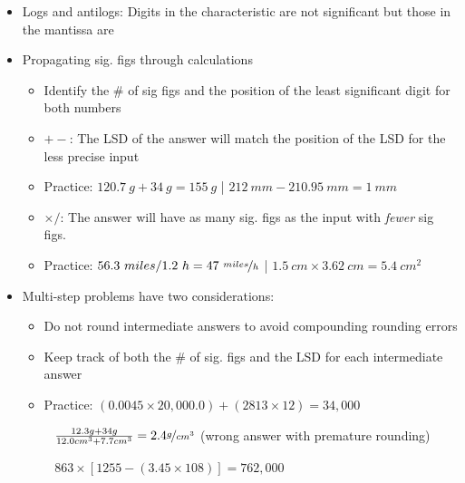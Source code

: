\documentclass[12pt, openany, letterpaper]{memoir}
\begin{document}
\begin{itemize}
	\item Logs and antilogs: Digits in the characteristic are not significant but those in the mantissa are
	\item Propagating sig. figs through calculations
	      \begin{itemize}
		      \item Identify the \# of sig figs and the position of the least significant digit for both numbers
		      \item $+-$: The LSD of the answer will match the position of the LSD for the less precise input
		      \item Practice: $120.7~g + 34~g = 155~g$ \hspace{1em}|\hspace{1em} $212~mm - 210.95~mm = 1~mm$
		      \item $\times/$: The answer will have as many sig. figs as the input with \emph{fewer} sig figs.
		      \item Practice: $56.3~miles / 1.2~h = 47~\nicefrac{miles}{h}$ \hspace{1em}|\hspace{1em} $1.5~cm\times3.62~cm = 5.4~cm^2$
	      \end{itemize}
	\item Multi-step problems have two considerations:
	      \begin{itemize}
		      \item Do not round intermediate answers to avoid compounding rounding errors
		      \item Keep track of both the \# of sig. figs and the LSD for each intermediate answer
		      \item Practice: $(0.0045\times20,000.0)+(2813\times12)=34,000$

		            ~\hphantom{Practice:} $\frac{12.3g+34g}{12.0cm^3+7.7cm^3}=2.4\nicefrac{g}{cm^3}$ (wrong answer with premature rounding)

		            ~\hphantom{Practice:} $863\times\left[1255-\left(3.45\times108\right)\right]=762,000$
	      \end{itemize}
\end{itemize}
\end{document}
